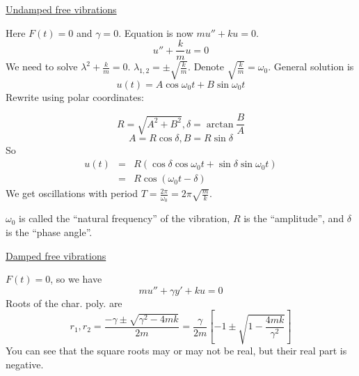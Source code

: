 \documentclass{article}
\newcommand{\mathpi}{\pi}
\newcommand{\tmtextbf}[1]{\text{{\bfseries{#1}}}}
\begin{document}
{\underline{Undamped free vibrations}}

Here $F (t) = 0$ and $\gamma = 0$. Equation is now $mu'' + ku = 0$.
\[ u'' + \frac{k}{m} u = 0 \]
We need to solve $\lambda^2 + \frac{k}{m} = 0$. $\lambda_{1, 2} = \pm
\sqrt{\frac{k}{m}}$. Denote $\sqrt{\frac{k}{m}} = \omega_0$. General solution
is
\[ u (t) = A \cos \omega_0 t + B \sin \omega_0 t \]
Rewrite using polar coordinates:

\begin{center}
\end{center}
\[ R = \sqrt{A^2 + B^2}, \delta = \arctan \frac{B}{A} \]
\[ A = R \cos \delta, B = R \sin \delta \]
So
\begin{eqnarray*}
  u (t) & = & R (\cos \delta \cos \omega_0 t + \sin \delta \sin \omega_0 t)\\
  & = & R \cos (\omega_0 t - \delta)
\end{eqnarray*}
We get oscillations with period $T = \frac{2 \mathpi}{\omega_0} = 2 \mathpi
\sqrt{\frac{m}{k}}$.

$\omega_0$ is called the ``natural frequency'' of the vibration, $R$ is the
``amplitude'', and $\delta$ is the ``phase angle''.

{\underline{Damped free vibrations}}

$F (t) = 0$, so we have
\[ mu'' + \gamma y' + ku = 0 \]
Roots of the char. poly. are
\[ r_1, r_2 = \frac{- \gamma \pm \sqrt{\gamma^2 - 4 mk}}{2 m} =
   \frac{\gamma}{2 m} \left[ - 1 \pm \sqrt{1 - \frac{4 mk}{\gamma^2}} \right]
\]
You can see that the square roots may or may not be real, but their real part
is \tmtextbf{always} negative.
\end{document}
